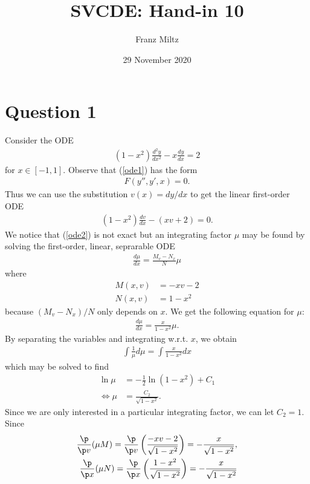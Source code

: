 \documentclass{article}
\begin{document}
\title{SVCDE: Hand-in 10}
\author{Franz Miltz}
\date{29 November 2020}
\maketitle


\section*{Question 1}


Consider the ODE
\begin{align}
    \label{ode1}
    (1-x^2)\frac{d^2y}{dx^2} - x\frac{dy}{dx} = 2
\end{align}
for $x\in [-1,1]$. Observe that (\ref{ode1}) has the form 
\begin{align*}
    F(y'',y',x)=0.
\end{align*}
Thus we can use the substitution $v(x)=dy/dx$ to get the linear 
first-order ODE
\begin{align}
    \label{ode2}
    (1-x^2)\frac{dv}{dx}-(xv+2) = 0. 
\end{align}
We notice that (\ref{ode2}) is not exact but an integrating factor $\mu$ may
be found by solving the first-order, linear, seprarable ODE
\begin{align*}
    \frac{d\mu}{dx} = \frac{M_v-N_x}{N}\mu
\end{align*}
where
\begin{align*}
    M(x,v) &= -xv-2\\
    N(x,v) &= 1-x^2
\end{align*}
because $(M_v-N_x)/N$ only depends on $x$. We get the following equation for
$\mu$:
\begin{align*}
    \frac{d\mu}{dx}=\frac{x}{1-x^2}\mu.
\end{align*}
By separating the variables and integrating w.r.t. $x$, we obtain
\begin{align*}
    \int \frac{1}{\mu}d\mu = \int \frac{x}{1-x^2}dx
\end{align*}
which may be solved to find 
\begin{align*}
    \ln\mu &= -\frac{1}{2}\ln(1-x^2)+C_1\\
    \Leftrightarrow \mu &=\frac{C_2}{\sqrt{1-x^2}}.
\end{align*}
Since we are only interested in a particular integrating factor, we can
let $C_2=1$. Since
\begin{align*}
    \frac{\p}{\p v}(\mu M) = \frac{\p}{\p v}\left(\frac{-xv-2}{\sqrt{1-x^2}}\right)=-\frac{x}{\sqrt{1-x^2}},\\
    \frac{\p}{\p x}(\mu N) = \frac{\p}{\p x}\left(\frac{1-x^2}{\sqrt{1-x^2}}\right)=-\frac{x}{\sqrt{1-x^2}}
\end{align*}
\end{document}
